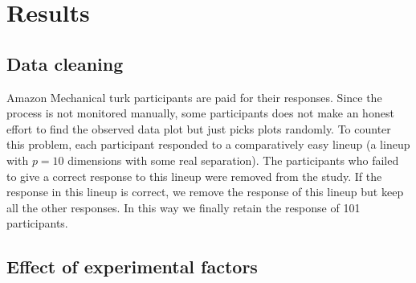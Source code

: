 \documentclass[12]{article}
\begin{document}
\section{Results}



\subsection{Data cleaning}

Amazon Mechanical turk participants are paid for their responses. Since the process is not monitored manually, some participants does not make an honest effort to find the observed data plot but just picks plots randomly. To counter this problem, each participant responded to a comparatively easy lineup (a lineup with $p = 10$ dimensions with some real separation). The participants who failed to give a correct response to this lineup were removed from the study. If the response in this lineup is correct, we remove the response of this lineup but keep all the other responses. In this way we finally retain the response of 101 participants.  

\subsection{Effect of experimental factors} \label{effects}
\end{document}
